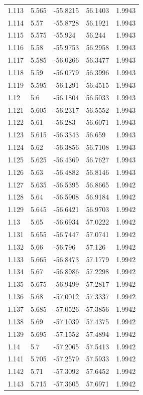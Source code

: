 \begin{tabular}{lllll}
1.113 & 5.565 & -55.8215 & 56.1403 & 1.9943 \\
1.114 & 5.57 & -55.8728 & 56.1921 & 1.9943 \\
1.115 & 5.575 & -55.924 & 56.244 & 1.9943 \\
1.116 & 5.58 & -55.9753 & 56.2958 & 1.9943 \\
1.117 & 5.585 & -56.0266 & 56.3477 & 1.9943 \\
1.118 & 5.59 & -56.0779 & 56.3996 & 1.9943 \\
1.119 & 5.595 & -56.1291 & 56.4515 & 1.9943 \\
1.12 & 5.6 & -56.1804 & 56.5033 & 1.9943 \\
1.121 & 5.605 & -56.2317 & 56.5552 & 1.9943 \\
1.122 & 5.61 & -56.283 & 56.6071 & 1.9943 \\
1.123 & 5.615 & -56.3343 & 56.659 & 1.9943 \\
1.124 & 5.62 & -56.3856 & 56.7108 & 1.9943 \\
1.125 & 5.625 & -56.4369 & 56.7627 & 1.9943 \\
1.126 & 5.63 & -56.4882 & 56.8146 & 1.9943 \\
1.127 & 5.635 & -56.5395 & 56.8665 & 1.9942 \\
1.128 & 5.64 & -56.5908 & 56.9184 & 1.9942 \\
1.129 & 5.645 & -56.6421 & 56.9703 & 1.9942 \\
1.13 & 5.65 & -56.6934 & 57.0222 & 1.9942 \\
1.131 & 5.655 & -56.7447 & 57.0741 & 1.9942 \\
1.132 & 5.66 & -56.796 & 57.126 & 1.9942 \\
1.133 & 5.665 & -56.8473 & 57.1779 & 1.9942 \\
1.134 & 5.67 & -56.8986 & 57.2298 & 1.9942 \\
1.135 & 5.675 & -56.9499 & 57.2817 & 1.9942 \\
1.136 & 5.68 & -57.0012 & 57.3337 & 1.9942 \\
1.137 & 5.685 & -57.0526 & 57.3856 & 1.9942 \\
1.138 & 5.69 & -57.1039 & 57.4375 & 1.9942 \\
1.139 & 5.695 & -57.1552 & 57.4894 & 1.9942 \\
1.14 & 5.7 & -57.2065 & 57.5413 & 1.9942 \\
1.141 & 5.705 & -57.2579 & 57.5933 & 1.9942 \\
1.142 & 5.71 & -57.3092 & 57.6452 & 1.9942 \\
1.143 & 5.715 & -57.3605 & 57.6971 & 1.9942 \\

\end{tabular}
